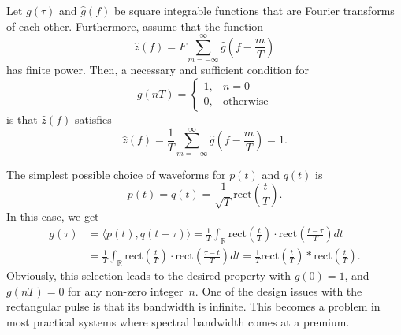 \begin{theorem}[Nyquist] \label{theorem:NyquistPulseCriterion}
Let $g(\tau)$ and $\hat{g}(f)$ be square integrable functions that are Fourier transforms of each other.
Furthermore, assume that the function
\begin{equation*}
\hat{z} (f) = F \sum_{m=-\infty}^{\infty} \hat{g} \left( f - \frac{m}{T} \right)
\end{equation*}
has finite power.
Then, a necessary and sufficient condition for
\begin{equation*}
g(nT) = \begin{cases} 1, & n = 0 \\
0, & \text{otherwise} \end{cases}
\end{equation*}
is that $\hat{z} (f)$ satisfies
\begin{equation*}
\hat{z}(f) = \frac{1}{T} \sum_{m=-\infty}^{\infty} \hat{g} \left( f - \frac{m}{T} \right) = 1 .
\end{equation*}
\end{theorem}

\begin{example}
The simplest possible choice of waveforms for $p(t)$ and $q(t)$ is
\begin{equation*}
p(t) = q(t) = \frac{1}{\sqrt{T}} \mathrm{rect} \left( \frac{t}{T} \right) .
\end{equation*}
In this case, we get
\begin{equation*}
\begin{split}
g(\tau) &= \langle p(t), q(t-\tau) \rangle
= \frac{1}{T} \int_{\mathbb{R}} \mathrm{rect} \left( \frac{t}{T} \right)
\cdot \mathrm{rect} \left( \frac{t - \tau}{T} \right) dt \\
&= \frac{1}{T} \int_{\mathbb{R}} \mathrm{rect} \left( \frac{t}{T} \right)
\cdot \mathrm{rect} \left( \frac{\tau - t}{T} \right) dt
= \frac{1}{T} \mathrm{rect} \left( \frac{t}{T} \right)
\ast \mathrm{rect}\left( \frac{t}{T} \right) .
\end{split}
\end{equation*}
Obviously, this selection leads to the desired property with $g(0) = 1$, and $g(nT) = 0$ for any non-zero integer~$n$.
One of the design issues with the rectangular pulse is that its bandwidth is infinite.
This becomes a problem in most practical systems where spectral bandwidth comes at a premium.
\end{example}

